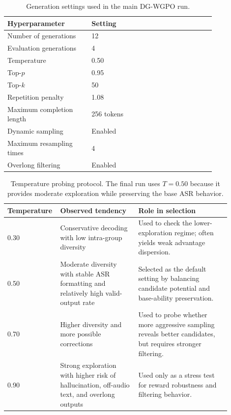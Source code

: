 \documentclass{article}
\begin{document}
\begin{table}[t]
\centering
\small
\caption{
Generation settings used in the main DG-WGPO run.
}
\label{tab:dg_wgpo_generation_hparams}
\begin{tabular}{p{0.34\linewidth} p{0.50\linewidth}}
\toprule
\textbf{Hyperparameter} & \textbf{Setting} \\
\midrule
Number of generations
& 12 \\

Evaluation generations
& 4 \\

Temperature
& 0.50 \\

Top-$p$
& 0.95 \\

Top-$k$
& 50 \\

Repetition penalty
& 1.08 \\

Maximum completion length
& 256 tokens \\

Dynamic sampling
& Enabled \\

Maximum resampling times
& 4 \\

Overlong filtering
& Enabled \\
\bottomrule
\end{tabular}
\vspace{-2mm}
\end{table}

\begin{table}[t]
\centering
\small
\caption{
Temperature probing protocol. The final run uses $T=0.50$ because it provides
moderate exploration while preserving the base ASR behavior.
}
\label{tab:dg_wgpo_temperature_probe}
\begin{tabular}{p{0.16\linewidth} p{0.34\linewidth} p{0.40\linewidth}}
\toprule
\textbf{Temperature} & \textbf{Observed tendency} & \textbf{Role in selection} \\
\midrule
0.30
& Conservative decoding with low intra-group diversity
& Used to check the lower-exploration regime; often yields weak advantage
dispersion. \\

0.50
& Moderate diversity with stable ASR formatting and relatively high valid-output
rate
& Selected as the default setting by balancing candidate potential and
base-ability preservation. \\

0.70
& Higher diversity and more possible corrections
& Used to probe whether more aggressive sampling reveals better candidates, but
requires stronger filtering. \\

0.90
& Strong exploration with higher risk of hallucination, off-audio text, and
overlong outputs
& Used only as a stress test for reward robustness and filtering behavior. \\
\bottomrule
\end{tabular}
\vspace{-2mm}
\end{table}
\end{document}
